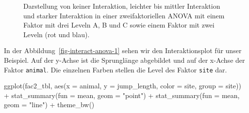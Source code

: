 \documentclass[
  letterpaper,
]{scrbook}
\newenvironment{Shaded}{\begin{snugshade}}{\end{snugshade}}
\newcommand{\AttributeTok}[1]{\textcolor[rgb]{0.40,0.45,0.13}{#1}}
\newcommand{\FunctionTok}[1]{\textcolor[rgb]{0.28,0.35,0.67}{#1}}
\newcommand{\NormalTok}[1]{\textcolor[rgb]{0.00,0.23,0.31}{#1}}
\newcommand{\SpecialCharTok}[1]{\textcolor[rgb]{0.37,0.37,0.37}{#1}}
\newcommand{\StringTok}[1]{\textcolor[rgb]{0.13,0.47,0.30}{#1}}
\begin{document}
\begin{figure}
\begin{minipage}[t]{0.33\linewidth}
{{}

}

\end{minipage}%

\caption{\label{fig-anova-inter-example}Darstellung von keiner
Interaktion, leichter bis mittler Interaktion und starker Interaktion in
einer zweifaktoriellen ANOVA mit einem Faktor mit drei Leveln A, B und C
sowie einem Faktor mit zwei Leveln (rot und blau).}

\end{figure}

In der Abbildung~\ref{fig-interact-anova-1} sehen wir den
Interaktionsplot für unser Beispiel. Auf der y-Achse ist die Sprunglänge
abgebildet und auf der x-Achse der Faktor \texttt{animal}. Die einzelnen
Farben stellen die Level des Faktor \texttt{site} dar.

\begin{Shaded}
\begin{Highlighting}[]
\FunctionTok{ggplot}\NormalTok{(fac2\_tbl, }\FunctionTok{aes}\NormalTok{(}\AttributeTok{x =}\NormalTok{ animal, }\AttributeTok{y =}\NormalTok{ jump\_length,}
                     \AttributeTok{color =}\NormalTok{ site, }\AttributeTok{group =}\NormalTok{ site)) }\SpecialCharTok{+}
  \FunctionTok{stat\_summary}\NormalTok{(}\AttributeTok{fun =}\NormalTok{ mean, }\AttributeTok{geom =} \StringTok{"point"}\NormalTok{) }\SpecialCharTok{+}
  \FunctionTok{stat\_summary}\NormalTok{(}\AttributeTok{fun =}\NormalTok{ mean, }\AttributeTok{geom =} \StringTok{"line"}\NormalTok{) }\SpecialCharTok{+}
  \FunctionTok{theme\_bw}\NormalTok{()}
\end{Highlighting}
\end{Shaded}
\end{document}
